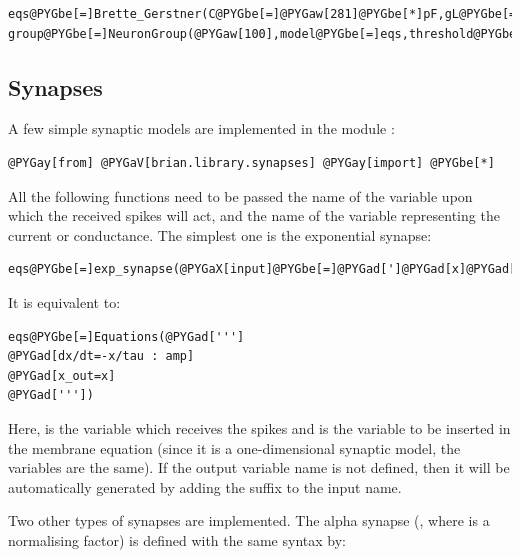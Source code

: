 \documentclass[letterpaper,10pt]{manual}
\begin{document}
\begin{Verbatim}[commandchars=@\[\]]
eqs@PYGbe[=]Brette_Gerstner(C@PYGbe[=]@PYGaw[281]@PYGbe[*]pF,gL@PYGbe[=]@PYGaw[30]@PYGbe[*]nS,EL@PYGbe[=]@PYGbe[-]@PYGaw[70.6]@PYGbe[*]mV,VT@PYGbe[=]@PYGbe[-]@PYGaw[50.4]@PYGbe[*]mV,DeltaT@PYGbe[=]@PYGaw[2]@PYGbe[*]mV,tauw@PYGbe[=]@PYGaw[144]@PYGbe[*]ms,a@PYGbe[=]@PYGaw[4]@PYGbe[*]nS)
group@PYGbe[=]NeuronGroup(@PYGaw[100],model@PYGbe[=]eqs,threshold@PYGbe[=]@PYGbe[-]@PYGaw[43]@PYGbe[*]mV,reset@PYGbe[=]AdaptiveReset(Vr@PYGbe[=]@PYGbe[-]@PYGaw[70.6]@PYGbe[*]mvolt,b@PYGbe[=]@PYGaw[0.0805]@PYGbe[*]nA))
\end{Verbatim}


\subsection{Synapses}

A few simple synaptic models are implemented in the module :

\begin{Verbatim}[commandchars=@\[\]]
@PYGay[from] @PYGaV[brian.library.synapses] @PYGay[import] @PYGbe[*]
\end{Verbatim}

All the following functions need to be passed the name of the variable upon which the received spikes
will act, and the name of the variable representing the current or conductance.
The simplest one is the exponential synapse:

\begin{Verbatim}[commandchars=@\[\]]
eqs@PYGbe[=]exp_synapse(@PYGaX[input]@PYGbe[=]@PYGad[']@PYGad[x]@PYGad['],tau@PYGbe[=]@PYGaw[10]@PYGbe[*]ms,unit@PYGbe[=]amp,output@PYGbe[=]@PYGad[']@PYGad[x_current]@PYGad['])
\end{Verbatim}

It is equivalent to:

\begin{Verbatim}[commandchars=@\[\]]
eqs@PYGbe[=]Equations(@PYGad[''']
@PYGad[dx/dt=-x/tau : amp]
@PYGad[x_out=x]
@PYGad['''])
\end{Verbatim}

Here,  is the variable which receives the spikes and  is the variable to be inserted in
the membrane equation (since it is a one-dimensional synaptic model, the variables are the same).
If the output variable name is not defined, then it will be automatically generated by adding the
suffix  to the input name.

Two other types of synapses are implemented. The alpha synapse (, where
 is a normalising factor) is defined with the same syntax by:
\end{document}
